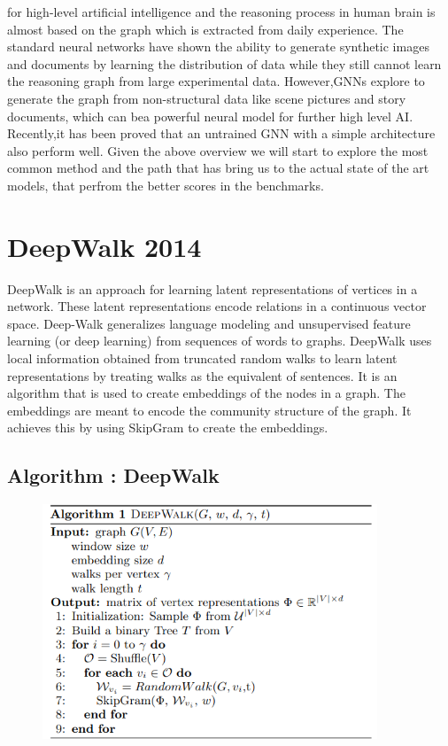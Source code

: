 \documentclass[12pt,a4paper]{article}
\begin{document}
for high-level artificial  intelligence and the reasoning process in human brain is almost based on the graph which is extracted from daily experience. The standard neural networks have shown the ability to generate synthetic images and documents by learning the distribution of data while they still cannot learn the reasoning graph from large experimental data. However,GNNs explore to generate the graph from non-structural data like scene pictures and story documents, which can bea powerful neural model for further high level AI. Recently,it has been proved that an untrained GNN with a simple architecture also perform well. Given the above overview we will start to explore the most common method and the path that has bring us to the actual state of the art models, that perfrom the better scores in the benchmarks. 

\newpage

\section*{DeepWalk 2014}
DeepWalk is an approach for learning latent representations of vertices in a network. These latent representations encode relations in a continuous vector space. Deep-Walk generalizes language modeling and unsupervised feature learning (or deep learning) from sequences of words to graphs. DeepWalk uses local information obtained from truncated random walks to learn latent representations by treating walks as the equivalent of sentences. It is an algorithm that is used to create embeddings of the nodes in a graph. The embeddings are meant to encode the community structure of the graph. It achieves this by using SkipGram to create the embeddings.

\subsection*{Algorithm : DeepWalk}

\begin{figure}[h]
\includegraphics[width=10cm]{DeepWalkAlgorithm}
\centering
\end{figure}
\end{document}
